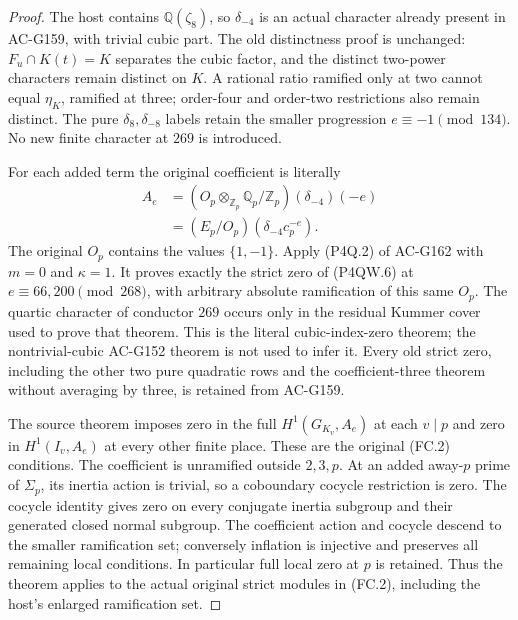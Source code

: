\begin{proof}
The host contains $\mathbb Q(\zeta_8)$, so $\delta_{-4}$ is
an actual character already present in AC-G159, with trivial cubic part.
The old distinctness proof is unchanged: $F_u\cap K(t)=K$
separates the cubic factor, and the distinct two-power characters
remain distinct on $K$.  A rational ratio ramified only at two
cannot equal $\eta_K$, ramified at three; order-four and
order-two restrictions also remain distinct.
The pure $\delta_8,\delta_{-8}$ labels retain the smaller
progression $e\equiv-1\pmod{134}$.
No new finite character at $269$ is introduced.

For each added term the original coefficient is literally
\[
 \begin{aligned}
 A_e&=(O_p\otimes_{\mathbb Z_p}\mathbb Q_p/\mathbb Z_p)
                                                   (\delta_{-4})(-e)\\
    &=(E_p/O_p)(\delta_{-4}c_p^{-e}).
 \end{aligned}
 \tag{P4QW.6}
\]
The original $O_p$ contains the values $\{1,-1\}$.
Apply (P4Q.2) of AC-G162 with $m=0$ and $\kappa=1$.
It proves exactly the strict zero of (P4QW.6) at
$e\equiv66,200\pmod{268}$, with arbitrary absolute
ramification of this same $O_p$.
The quartic character of conductor $269$ occurs only in the
residual Kummer cover used to prove that theorem.
This is the literal cubic-index-zero theorem; the nontrivial-cubic
AC-G152 theorem is not used to infer it.
Every old strict zero, including the other two pure quadratic rows
and the coefficient-three theorem without averaging by three,
is retained from AC-G159.

The source theorem imposes zero in the full
$H^1(G_{K_v},A_e)$ at each $v\mid p$ and zero in
$H^1(I_v,A_e)$ at every other finite place.
These are the original (FC.2) conditions.
The coefficient is unramified outside $2,3,p$.
At an added away-$p$ prime of $\Sigma_p$, its inertia action is
trivial, so a coboundary cocycle restriction is zero.
The cocycle identity gives zero on every conjugate inertia
subgroup and their generated closed normal subgroup.
The coefficient action and cocycle descend to the smaller
ramification set; conversely inflation is injective and preserves
all remaining local conditions.  In particular full local zero
at $p$ is retained.
Thus the theorem applies to the actual original strict modules
in (FC.2), including the host's enlarged ramification set.


\end{proof}
